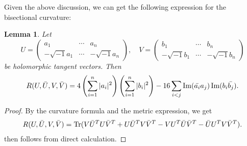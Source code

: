 \documentclass[11pt]{amsart}
\theoremstyle{plain}
\newtheorem{lem}[thm]{Lemma}
\theoremstyle{definition}
\numberwithin{equation}{section}
\DeclareMathOperator{\tr}{Tr}
\DeclareMathOperator{\Imagine}{Im}
\begin{document}
Given the above discussion, we can get the following expression for the bisectional curvature:
\begin{lem}\label{lem:BisectionalCurvature}
    Let 
    \[U=\begin{pmatrix}
        a_1&\cdots&a_n\\
        -\sqrt{-1}a_1&\cdots&-\sqrt{-1}a_n
    \end{pmatrix},\quad V=\begin{pmatrix}
        b_1&\cdots&b_n\\
        -\sqrt{-1}b_1&\cdots&-\sqrt{-1}b_n
    \end{pmatrix}\]
    be holomorphic tangent vectors. Then 
    \begin{equation}\label{eq:BisectionalCurvature}
        R(U,\Bar{U},V,\Bar{V})=4\left(\sum_{i=1}^n|a_i|^2\right)\left(\sum_{i=1}^n|b_i|^2\right)-16\sum_{i<j}\Imagine(\Bar{a_i}a_j)\Imagine(b_i\Bar{b_j}).
    \end{equation}
\end{lem}
\begin{proof}
    By the curvature formula  and the metric expression, we get
    \begin{align*}
        R(U,\Bar{U},V,\Bar{V})=\tr(V\Bar{U}^TU\Bar{V}^T+U\Bar{U}^TV\Bar{V}^T-VU^T\Bar{U}\Bar{V}^T-\Bar{U}U^TV\Bar{V}^T).
    \end{align*}
     then follows from direct calculation.
\end{proof}
\end{document}
